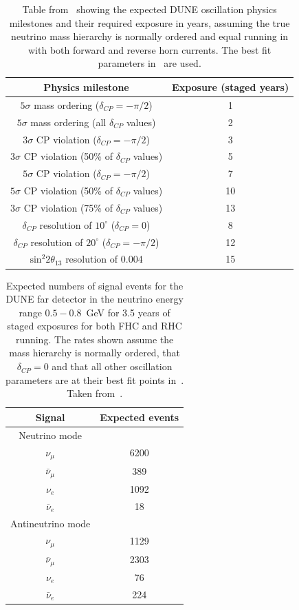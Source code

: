 \begin{table}
  \caption{Table from~\cite{tdrVol2} showing the expected DUNE oscillation physics milestones and their required exposure in years, assuming the true neutrino mass hierarchy is normally ordered and equal running in with both forward and reverse horn currents. The best fit parameters in~\cite{nufit4} are used.}
  \label{tab:physicsMilestones}
  \centering
  \begin{tabular}{c c}
    \hline
    Physics milestone & Exposure (staged years) \\
    \hline
    $5\sigma$ mass ordering ($\delta_{CP} = -\pi/2$) & 1 \\
    $5\sigma$ mass ordering (all $\delta_{CP}$ values) & 2 \\
    $3\sigma$ CP violation ($\delta_{CP}=-\pi/2$) & 3 \\
    $3\sigma$ CP violation (50\% of $\delta_{CP}$ values) & 5 \\
    $5\sigma$ CP violation ($\delta_{CP}=-\pi/2$) & 7 \\
    $5\sigma$ CP violation (50\% of $\delta_{CP}$ values) & 10 \\
    $3\sigma$ CP violation (75\% of $\delta_{CP}$ values) & 13 \\
    $\delta_{CP}$ resolution of $10^{\circ}$ ($\delta_{CP}=0$) & 8 \\
    $\delta_{CP}$ resolution of $20^{\circ}$ ($\delta_{CP}=-\pi/2$) & 12 \\
    $\text{sin}^{2}2\theta_{13}$ resolution of 0.004 & 15 \\
    \hline
  \end{tabular}
\end{table}

\begin{table}
  \caption{Expected numbers of signal events for the DUNE far detector in the neutrino energy range $0.5-0.8$~GeV for 3.5 years of staged exposures for both FHC and RHC running. The rates shown assume the mass hierarchy is normally ordered, that $\delta_{CP}=0$ and that all other oscillation parameters are at their best fit points in~\cite{nufit4}. Taken from~\cite{tdrVol2}.}
  \label{tab:statistics}
  \centering
  \begin{tabular}{c c}
    \hline
    Signal & Expected events \\
    \hline
    \hline
    Neutrino mode & \\
    $\nu_{\mu}$ & 6200 \\
    $\bar{\nu}_{\mu}$ & 389 \\
    $\nu_{e}$ & 1092 \\
    $\bar{\nu}_{e}$ & 18 \\
    \hline
    Antineutrino mode & \\
    $\nu_{\mu}$ & 1129 \\
    $\bar{\nu}_{\mu}$ & 2303 \\
    $\nu_{e}$ & 76 \\
    $\bar{\nu}_{e}$ & 224 \\
    \hline
  \end{tabular}
\end{table}

